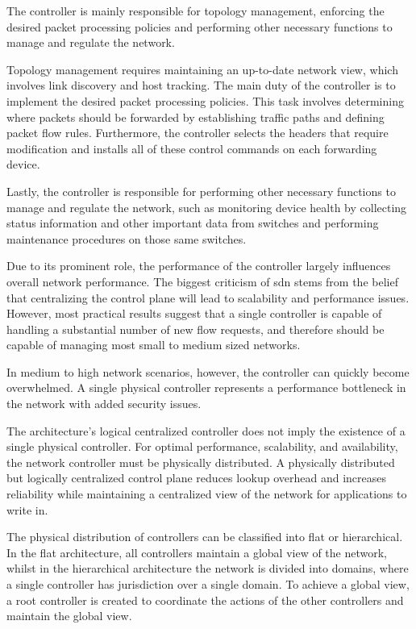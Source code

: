 The controller is mainly responsible for topology management, enforcing the desired packet processing policies and performing other necessary functions to manage and regulate the network. \cite{peterson_software-defined_2021}\cite{latif_comprehensive_2020}\cite{bifulco_survey_2018}\cite{kreutz_software-defined_2015}\cite{zhu_sdn_2020}

Topology management requires maintaining an up-to-date network view, which involves link discovery and host tracking.
The main duty of the controller is to implement the desired packet processing policies. This task involves determining where packets should be forwarded by establishing traffic paths and defining packet flow rules. Furthermore, the controller selects the headers that require modification and installs all of these control commands on each forwarding device.

Lastly, the controller is responsible for performing other necessary functions to manage and regulate the network, such as monitoring device health by collecting status information and other important data from switches and performing maintenance procedures on those same switches.

Due to its prominent role, the performance of the controller largely influences overall network performance. The biggest criticism of \gls{sdn} stems from the belief that centralizing the control plane will lead to scalability and performance issues. However, most practical results suggest that a single controller is capable of handling a substantial number of new flow requests, and therefore should be capable of managing most small to medium sized networks\cite{nunes_survey_2014}\cite{zhu_sdn_2020}.

In medium to high network scenarios, however, the controller can quickly become overwhelmed. A single physical controller represents a performance bottleneck in the network with added security issues. \cite{zhu_sdn_2020}

The architecture's logical centralized controller does not imply the existence of a single physical controller. For optimal performance, scalability, and availability, the network controller must be physically distributed\cite{kreutz_software-defined_2015}. A physically distributed but logically centralized control plane reduces lookup overhead and increases reliability while maintaining a centralized view of the network for applications to write in. \cite{nunes_survey_2014}

The physical distribution of controllers can be classified into flat or hierarchical\cite{zhu_sdn_2020}. In the flat architecture, all controllers maintain a global view of the network, whilst in the hierarchical architecture the network is divided into domains, where a single controller has jurisdiction over a single domain. To achieve a global view, a root controller is created to coordinate the actions of the other controllers and maintain the global view. 

